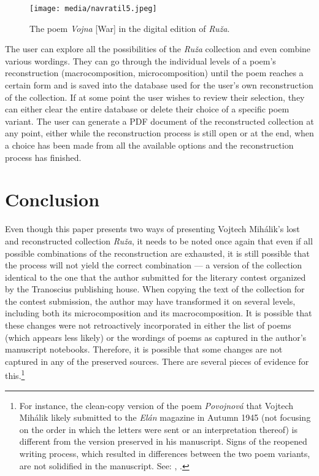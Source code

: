 \begin{paper}
\begin{figure}[H]
  \centering
  \texttt{[image: media/navratil5.jpeg]}
    \caption{The poem \emph{Vojna} [War] in the digital edition of \emph{Ruža}.}
    \label{fig:navratil4}
  \end{figure}

The user can explore all the possibilities of the \emph{Ruža} collection
and even combine various wordings. They can go through the individual
levels of a poem's reconstruction (macrocomposition, microcomposition)
until the poem reaches a certain form and is saved into the database
used for the user's own reconstruction of the collection. If at some
point the user wishes to review their selection, they can either clear
the entire database or delete their choice of a specific poem variant.
The user can generate a PDF document of the reconstructed collection at
any point, either while the reconstruction process is still open or at
the end, when a choice has been made from all the available options and
the reconstruction process has finished.

\hypertarget{conclusion}{%
\section*{Conclusion}\label{conclusion}}

Even though this paper presents two ways of presenting Vojtech Mihálik's
lost and reconstructed collection \emph{Ruža}, it needs to be noted once
again that even if all possible combinations of the reconstruction are
exhausted, it is still possible that the process will not yield the
correct combination –– a version of the collection identical to the one
that the author submitted for the literary contest organized by the
Tranoscius publishing house. When copying the text of the collection for
the contest submission, the author may have transformed it on several
levels, including both its microcomposition and its macrocomposition. It
is possible that these changes were not retroactively incorporated in
either the list of poems (which appears less likely) or the wordings of
poems as captured in the author's manuscript notebooks. Therefore, it is
possible that some changes are not captured in any of the preserved
sources. There are several pieces of evidence for this.\footnote{For
  instance, the clean-copy version of the poem \emph{Povojnová} that
  Vojtech Mihálik likely submitted to the \emph{Elán} magazine in Autumn
  1945 (not focusing on the order in which the letters were sent or an
  interpretation thereof) is different from the version preserved in his
  manuscript. Signs of the reopened writing process, which resulted in
  differences between the two poem variants, are not solidified in the
  manuscript. See: \cite{mihalik_skapinajuci_nodate}, .}


\end{paper}
